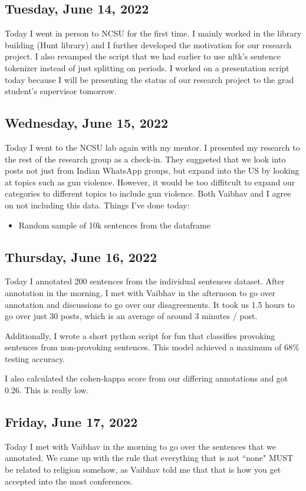 \documentclass[11pt,letterpaper]{article}
\begin{document}
\subsection{Tuesday, June 14, 2022}
Today I went in person to NCSU for the first time. I mainly worked in the library building (Hunt library) and I further developed the motivation for our research project. I also revamped the script that we had earlier to use nltk's sentence tokenizer instead of just splitting on periods. I worked on a presentation script today because I will be presenting the status of our research project to the grad student's supervisor tomorrow.

\subsection{Wednesday, June 15, 2022}
Today I went to the NCSU lab again with my mentor. I presented my research to the rest of the research group as a check-in. They suggseted that we look into posts not just from Indian WhatsApp groups, but expand into the US by looking at topics such as gun violence. However, it would be too diffitcult to expand our categories to different topics to include gun violence. Both Vaibhav and I agree on not including this data. Things I've done today:

\begin{itemize}
    \item Random sample of 10k sentences from the dataframe
\end{itemize}

\subsection{Thursday, June 16, 2022}
Today I annotated 200 sentences from the individual sentences dataset. After annotation in the morning, I met with Vaibhav in the afternoon to go over annotation and discussions to go over our disagreements. It took us 1.5 hours to go over just 30 posts, which is an average of around 3 minutes / post.

Additionally, I wrote a short python script for fun that classifies provoking sentences from non-provoking sentences. This model achieved a maximum of 68\% testing accuracy.


I also calculated the cohen-kappa score from our differing annotations and got 0.26. This is really low.

\subsection{Friday, June 17, 2022}
Today I met with Vaibhav in the morning to go over the sentences that we annotated. We came up with the rule that everything that is not ``none" MUST be related to religion somehow, as Vaibhav told me that that is how you get accepted into the most conferences. 
\end{document}
